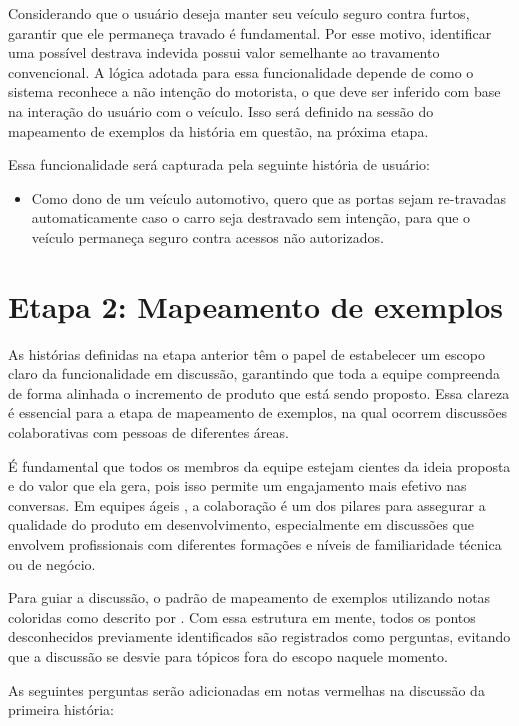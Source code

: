 Considerando que o usuário deseja manter seu veículo seguro contra furtos, garantir que ele permaneça travado é fundamental. Por esse motivo, identificar uma possível 
destrava indevida possui valor semelhante ao travamento convencional. A lógica adotada para essa funcionalidade depende de como o sistema reconhece a não intenção 
do motorista, o que deve ser inferido com base na interação do usuário com o veículo. Isso será definido na sessão do mapeamento de exemplos da história em questão, 
na próxima etapa.

Essa funcionalidade será capturada pela seguinte história de usuário:

\begin{itemize}
    \item Como dono de um veículo automotivo, quero que as portas sejam re-travadas automaticamente caso o carro seja destravado sem intenção, para que o veículo permaneça seguro contra acessos não autorizados.
\end{itemize}

\section{Etapa 2: Mapeamento de exemplos}
As histórias definidas na etapa anterior têm o papel de estabelecer um escopo claro da funcionalidade em discussão, garantindo que toda a equipe compreenda de forma 
alinhada o incremento de produto que está sendo proposto. Essa clareza é essencial para a etapa de mapeamento de exemplos, na qual ocorrem discussões colaborativas 
com pessoas de diferentes áreas.

É fundamental que todos os membros da equipe estejam cientes da ideia proposta e do valor que ela gera, pois isso permite um engajamento mais efetivo nas conversas. 
Em equipes ágeis \cite{atlassianAgileTeams}, a colaboração é um dos pilares para assegurar a qualidade do produto em desenvolvimento, especialmente em discussões que 
envolvem profissionais com diferentes formações e níveis de familiaridade técnica ou de negócio.

Para guiar a discussão, o padrão de mapeamento de exemplos utilizando notas coloridas como descrito por \cite{cucumberExampleMapping}. Com essa estrutura em mente, 
todos os pontos desconhecidos previamente identificados são registrados como perguntas, evitando que a discussão se desvie para tópicos fora do escopo naquele momento. 

As seguintes perguntas serão adicionadas em notas vermelhas na discussão da primeira história:

